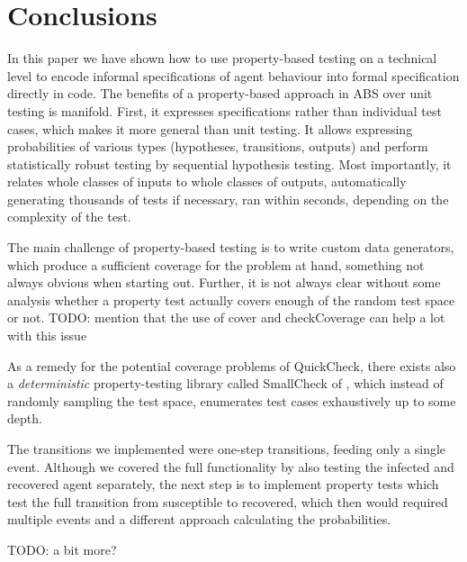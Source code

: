 \section{Conclusions}
\label{sec:conclusions}
In this paper we have shown how to use property-based testing on a technical level to encode informal specifications of agent behaviour into formal specification directly in code. The benefits of a property-based approach in ABS over unit testing is manifold. First, it expresses specifications rather than individual test cases, which makes it more general than unit testing. It allows expressing probabilities of various types (hypotheses, transitions, outputs) and perform statistically robust testing by sequential hypothesis testing. Most importantly, it relates whole classes of inputs to whole classes of outputs, automatically generating thousands of tests if necessary, ran within seconds, depending on the complexity of the test. 

The main challenge of property-based testing is to write custom data generators, which produce a sufficient coverage for the problem at hand, something not always obvious when starting out. Further, it is not always clear without some analysis whether a property test actually covers enough of the random test space or not. TODO: mention that the use of cover and checkCoverage can help a lot with this issue

As a remedy for the potential coverage problems of QuickCheck, there exists also a \textit{deterministic} property-testing library called SmallCheck of \cite{runciman_smallcheck_2008}, which instead of randomly sampling the test space, enumerates test cases exhaustively up to some depth.


\medskip

The transitions we implemented were one-step transitions, feeding only a single event. Although we covered the full functionality by also testing the infected and recovered agent separately, the next step is to implement property tests which test the full transition from susceptible to recovered, which then would required multiple events and a different approach calculating the probabilities.

TODO: a bit more?